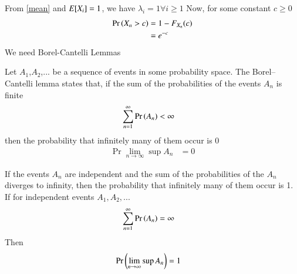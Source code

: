 \documentclass[journal,12pt,twocolumn]{IEEEtran}
\begin{document}
From \eqref{mean} and $E[ X_i ]=1$, we have $\lambda_i=1 \forall  i \geq1$
Now, for some constant $c\geq0$ 
\begin{align}
    \Pr\left(X_n>c\right)&=1-F_{X_n}(c)\\
             &=e^{-c}\label{probability}
\end{align}
We need Borel-Cantelli Lemmas
\begin{lemma}\label{Lemma1}
Let $A_1$,$A_2$,... be a sequence of events in some probability space. The Borel–Cantelli lemma states that, if the sum of the probabilities of the events $A_n$ is finite
\begin{align}
    \sum_{n=1}^{\infty}\Pr\left(A_n\right)&<\infty
\end{align}
then the probability that infinitely many of them occur is 0
\begin{align}
    \Pr{\lim_{n \rightarrow \infty}\sup A_n}&=0
\end{align}
\end{lemma}
\begin{lemma}\label{Lemma2}
If the events $A_n$ are independent and the sum of the probabilities of the $A_n$ diverges to infinity, then the probability that infinitely many of them occur is 1.
If for independent events $A_1,A_2,...$
\begin{align}
    \sum_{n=1}^{\infty}\Pr\left(A_n\right)&=\infty
\end{align}
Then
\begin{align}
    \Pr\left(\lim_{n \rightarrow \infty}\sup A_n\right)&=1
\end{align}
\end{lemma}
\end{document}
